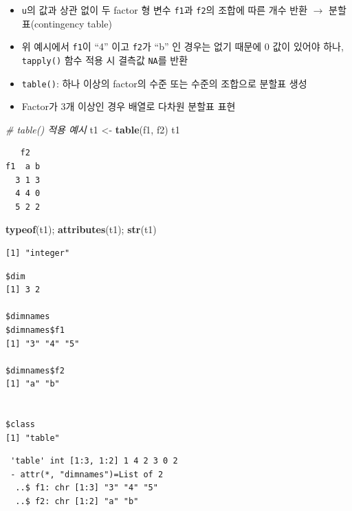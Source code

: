 \documentclass[
  11pt,
]{krantz}
\newenvironment{Shaded}{\begin{snugshade}}{\end{snugshade}}
\newcommand{\CommentTok}[1]{\textcolor[rgb]{0.37,0.37,0.37}{\textit{#1}}}
\newcommand{\KeywordTok}[1]{\textcolor[rgb]{0.27,0.27,0.27}{\textbf{#1}}}
\newcommand{\NormalTok}[1]{#1}
\newcommand{\StringTok}[1]{\textcolor[rgb]{0.5,0.5,0.5}{#1}}
\providecommand{\tightlist}{%
  \setlength{\itemsep}{0pt}\setlength{\parskip}{0pt}}
\begin{document}
\normalsize

\begin{itemize}
\tightlist
\item
  \texttt{u}의 값과 상관 없이 두 factor 형 변수 \texttt{f1}과 \texttt{f2}의 조합에 따른 개수 반환 \(\rightarrow\) 분할표(contingency table)
\item
  위 예시에서 \texttt{f1}이 ``4'' 이고 \texttt{f2}가 ``b'' 인 경우는 없기 때문에 0 값이 있어야 하나, \texttt{tapply()} 함수 적용 시 결측값 \texttt{NA}를 반환
\item
  \texttt{table()}: 하나 이상의 factor의 수준 또는 수준의 조합으로 분할표 생성
\item
  Factor가 3개 이상인 경우 배열로 다차원 분할표 표현
\end{itemize}

\footnotesize

\begin{Shaded}
\begin{Highlighting}[]
\CommentTok{# table() 적용 예시}
\NormalTok{t1 <-}\StringTok{ }\KeywordTok{table}\NormalTok{(f1, f2)}
\NormalTok{t1}
\end{Highlighting}
\end{Shaded}

\begin{verbatim}
   f2
f1  a b
  3 1 3
  4 4 0
  5 2 2
\end{verbatim}

\begin{Shaded}
\begin{Highlighting}[]
\KeywordTok{typeof}\NormalTok{(t1); }\KeywordTok{attributes}\NormalTok{(t1); }\KeywordTok{str}\NormalTok{(t1)}
\end{Highlighting}
\end{Shaded}

\begin{verbatim}
[1] "integer"
\end{verbatim}

\begin{verbatim}
$dim
[1] 3 2

$dimnames
$dimnames$f1
[1] "3" "4" "5"

$dimnames$f2
[1] "a" "b"


$class
[1] "table"
\end{verbatim}

\begin{verbatim}
 'table' int [1:3, 1:2] 1 4 2 3 0 2
 - attr(*, "dimnames")=List of 2
  ..$ f1: chr [1:3] "3" "4" "5"
  ..$ f2: chr [1:2] "a" "b"
\end{verbatim}
\end{document}
